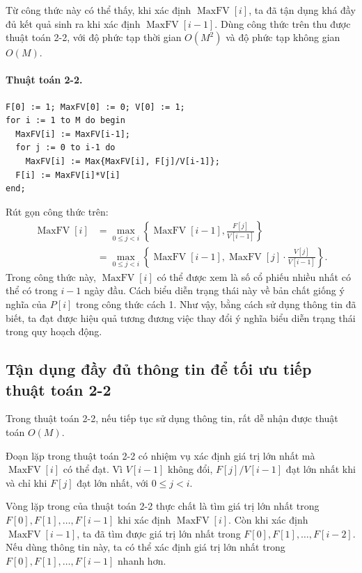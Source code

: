 \documentclass[11pt]{article}
\begin{document}
Từ công thức này có thể thấy, khi xác định \(\operatorname{MaxFV}[i]\), ta đã
tận dụng khá đầy đủ kết quả sinh ra khi xác định \(\operatorname{MaxFV}[i-1]\).
Dùng công thức trên thu được thuật toán 2-2, với độ phức tạp thời gian
\(O(M^2)\) và độ phức tạp không gian \(O(M)\).

\paragraph{Thuật toán 2-2.}
\begin{verbatim}
F[0] := 1; MaxFV[0] := 0; V[0] := 1;
for i := 1 to M do begin
  MaxFV[i] := MaxFV[i-1];
  for j := 0 to i-1 do
    MaxFV[i] := Max{MaxFV[i], F[j]/V[i-1]};
  F[i] := MaxFV[i]*V[i]
end;
\end{verbatim}

Rút gọn công thức trên:
\[
\begin{aligned}
\operatorname{MaxFV}[i]
&= \max_{0\le j<i}\left\{\operatorname{MaxFV}[i-1],
  \frac{F[j]}{V[i-1]}\right\}\\
&= \max_{0\le j<i}\left\{\operatorname{MaxFV}[i-1],
  \operatorname{MaxFV}[j]\cdot \frac{V[j]}{V[i-1]}\right\}.
\end{aligned}
\]
Trong công thức này, \(\operatorname{MaxFV}[i]\) có thể được xem là số cổ
phiếu nhiều nhất có thể có trong \(i-1\) ngày đầu. Cách biểu diễn trạng thái
này về bản chất giống ý nghĩa của \(P[i]\) trong công thức cách 1. Như vậy,
bằng cách sử dụng thông tin đã biết, ta đạt được hiệu quả tương đương việc
thay đổi ý nghĩa biểu diễn trạng thái trong quy hoạch động.

\subsection{Tận dụng đầy đủ thông tin để tối ưu tiếp thuật toán 2-2}

Trong thuật toán 2-2, nếu tiếp tục sử dụng thông tin, rất dễ nhận được thuật
toán \(O(M)\).

Đoạn lặp trong thuật toán 2-2 có nhiệm vụ xác định giá trị lớn nhất mà
\(\operatorname{MaxFV}[i]\) có thể đạt. Vì \(V[i-1]\) không đổi, \(F[j]/V[i-1]\)
đạt lớn nhất khi và chỉ khi \(F[j]\) đạt lớn nhất, với \(0\le j<i\).

Vòng lặp trong của thuật toán 2-2 thực chất là tìm giá trị lớn nhất trong
\(F[0],F[1],\ldots,F[i-1]\) khi xác định \(\operatorname{MaxFV}[i]\). Còn khi
xác định \(\operatorname{MaxFV}[i-1]\), ta đã tìm được giá trị lớn nhất trong
\(F[0],F[1],\ldots,F[i-2]\). Nếu dùng thông tin này, ta có thể xác định giá
trị lớn nhất trong \(F[0],F[1],\ldots,F[i-1]\) nhanh hơn.
\end{document}
